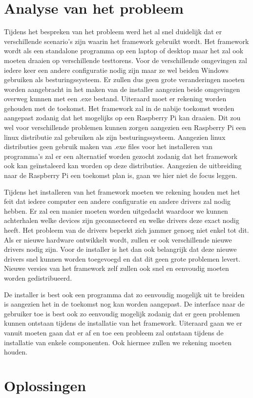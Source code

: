 \documentclass{article}
\begin{document}
\section{Analyse van het probleem} \label{section:analyse}
Tijdens het bespreken van het probleem werd het al snel duidelijk dat er verschillende scenario's zijn waarin het framework gebruikt wordt. 
Het framework wordt als een standalone programma op een laptop of desktop maar het zal ook moeten draaien op verschillende testtorens. 
Voor de verschillende omgevingen zal iedere keer een andere configuratie nodig zijn maar ze wel beiden Windows gebruiken als besturingssysteem. 
Er zullen dus geen grote veranderingen moeten worden aangebracht in het maken van de installer aangezien beide omgevingen overweg kunnen met een .exe bestand. 
Uiteraard moet er rekening worden gehouden met de toekomst. 
Het framework zal in de nabije toekomst worden aangepast zodanig dat het mogelijks op een Raspberry Pi kan draaien.
Dit zou wel voor verschillende problemen kunnen zorgen aangezien een Raspberry Pi een linux distributie zal gebruiken als zijn besturingssysteem.
Aangezien linux distributies geen gebruik maken van .exe files voor het installeren van programma's zal er een alternatief worden gezocht zodanig dat het framework ook kan ge\"instaleerd kan worden op deze distributies.
Aangezien de uitbreiding naar de Raspberry Pi een toekomst plan is, gaan we hier niet de focus leggen.

Tijdens het installeren van het framework moeten we rekening houden met het feit dat iedere computer een andere configuratie en andere drivers zal nodig hebben.
Er zal een manier moeten worden uitgedacht waardoor we kunnen achterhalen welke devices zijn geconnecteerd en welke drivers deze exact nodig heeft.
Het probleem van de drivers beperkt zich jammer genoeg niet enkel tot dit.
Als er nieuwe hardware ontwikkelt wordt, zullen er ook verschillende nieuwe drivers nodig zijn. 
Voor de installer is het dan ook belangrijk dat deze nieuwe drivers snel kunnen worden toegevoegd en dat dit geen grote problemen levert.
Nieuwe versies van het framework zelf zullen ook snel en eenvoudig moeten worden gedistribueerd.

De installer is best ook een programma dat zo eenvoudig mogelijk uit te breiden is aangezien het in de toekomst nog kan worden aangepast. 
De interface naar de gebruiker toe is best ook zo eenvoudig mogelijk zodanig dat er geen problemen kunnen ontstaan tijdens de installatie van het framework.
Uiteraard gaan we er vanuit moeten gaan dat er af en toe een probleem zal ontstaan tijdens de installatie van enkele componenten.
Ook hiermee zullen we rekening moeten houden.

\section{Oplossingen}



\end{document}
